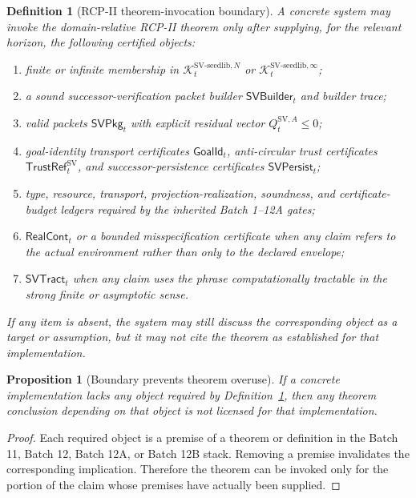 \documentclass[11pt]{article}
\newtheorem{proposition}[theorem]{Proposition}
\newtheorem{definition}[theorem]{Definition}
\newcommand{\1}{\mathbf{1}}
\providecommand{\Kcal}{\mathcal{K}}
\begin{document}
\begin{definition}[RCP-II theorem-invocation boundary]
\label{def:rcp2_theorem_invocation_boundary}
A concrete system may invoke the domain-relative RCP-II theorem only after supplying, for the relevant horizon, the following certified objects:
\begin{enumerate}[label=(\roman*),leftmargin=1.5em]
    \item finite or infinite membership in \(\Kcal_t^{\mathrm{SV\mbox{-}seedlib},N}\) or \(\Kcal_t^{\mathrm{SV\mbox{-}seedlib},\infty}\);
    \item a sound successor-verification packet builder \(\mathsf{SVBuilder}_t\) and builder trace;
    \item valid packets \(\mathsf{SVPkg}_t\) with explicit residual vector \(Q_t^{\mathrm{SV},A}\le0\);
    \item goal-identity transport certificates \(\mathsf{GoalId}_t\), anti-circular trust certificates \(\mathsf{TrustRef}_t^{\mathrm{SV}}\), and successor-persistence certificates \(\mathsf{SVPersist}_t\);
    \item type, resource, transport, projection-realization, soundness, and certificate-budget ledgers required by the inherited Batch 1--12A gates;
    \item \(\mathsf{RealCont}_t\) or a bounded misspecification certificate when any claim refers to the actual environment rather than only to the declared envelope;
    \item \(\mathsf{SVTract}_t\) when any claim uses the phrase computationally tractable in the strong finite or asymptotic sense.
\end{enumerate}
If any item is absent, the system may still discuss the corresponding object as a target or assumption, but it may not cite the theorem as established for that implementation.
\end{definition}

\begin{proposition}[Boundary prevents theorem overuse]
\label{prop:rcp2_boundary_prevents_overuse}
If a concrete implementation lacks any object required by Definition~\ref{def:rcp2_theorem_invocation_boundary}, then any theorem conclusion depending on that object is not licensed for that implementation.
\end{proposition}

\begin{proof}
Each required object is a premise of a theorem or definition in the Batch 11, Batch 12, Batch 12A, or Batch 12B stack. Removing a premise invalidates the corresponding implication. Therefore the theorem can be invoked only for the portion of the claim whose premises have actually been supplied.
\end{proof}
\end{document}
